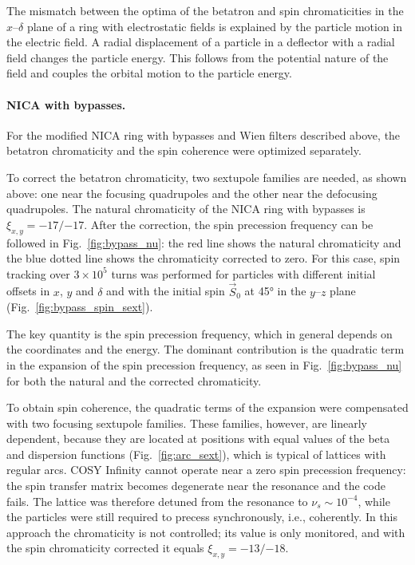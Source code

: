 The mismatch between the optima of the betatron and spin chromaticities in the
$x$--$\delta$ plane of a ring with electrostatic fields is explained by the
particle motion in the electric field. A radial displacement of a particle in
a deflector with a radial field changes the particle energy. This follows from
the potential nature of the field and couples the orbital motion to the
particle energy.

\paragraph{NICA with bypasses.}
For the modified NICA ring with bypasses and Wien filters described above, the
betatron chromaticity and the spin coherence were optimized separately.

To correct the betatron chromaticity, two sextupole families are needed, as
shown above: one near the focusing quadrupoles and the other near the
defocusing quadrupoles. The natural chromaticity of the NICA ring with
bypasses is $\xi_{x,y} = -17/{-17}$. After the correction, the spin precession
frequency can be followed in Fig.~\ref{fig:bypass_nu}: the red line shows the
natural chromaticity and the blue dotted line shows the chromaticity corrected
to zero. For this case, spin tracking over $3\times10^5$ turns was performed
for particles with different initial offsets in $x$, $y$ and $\delta$ and with
the initial spin $\vec{S}_0$ at \ang{45} in the $y$--$z$ plane
(Fig.~\ref{fig:bypass_spin_sext}).

The key quantity is the spin precession frequency, which in general depends on
the coordinates and the energy. The dominant contribution is the quadratic
term in the expansion of the spin precession frequency, as seen in
Fig.~\ref{fig:bypass_nu} for both the natural and the corrected
chromaticity.

To obtain spin coherence, the quadratic terms of the expansion were
compensated with two focusing sextupole families. These families, however,
are linearly dependent, because they are located at positions with equal
values of the beta and dispersion functions (Fig.~\ref{fig:arc_sext}), which
is typical of lattices with regular arcs. COSY Infinity cannot operate near a
zero spin precession frequency: the spin transfer matrix becomes degenerate
near the resonance and the code fails. The lattice was therefore detuned from
the resonance to $\nu_s\sim10^{-4}$, while the particles were still required to
precess synchronously, i.e., coherently. In this approach the chromaticity is
not controlled; its value is only monitored, and with the spin chromaticity
corrected it equals $\xi_{x,y} = -13/{-18}$.

